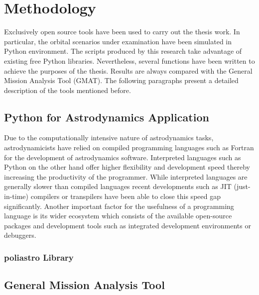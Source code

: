 \chapter{Methodology}

Exclusively open source tools have been used to carry out the thesis work. 
In particular, the orbital scenarios under examination have been simulated in Python environment.
The scripts produced by this research take advantage of existing free Python libraries.   
Nevertheless, several functions have been written to achieve the purposes of the thesis.
Results are always compared with the General Mission Analysis Tool (GMAT). 
The following paragraphs present a detailed description of the tools mentioned before.

\section{Python for Astrodynamics Application}

Due to the computationally intensive nature of astrodynamics tasks, astrodynamicists have relied on compiled programming languages such as Fortran for the development of astrodynamics software.
Interpreted languages such as Python on the other hand offer higher flexibility and development speed thereby increasing the productivity of the programmer.
While interpreted languages are generally slower than compiled languages recent developments such as JIT (just-in-time) compilers or transpilers have been able to close this speed gap
significantly. Another important factor for the usefulness of a
programming language is its wider ecosystem which consists
of the available open-source packages and development tools
such as integrated development environments or debuggers. \cite{eichhorn2018comparative}

\subsection{poliastro Library}

\section{General Mission Analysis Tool}